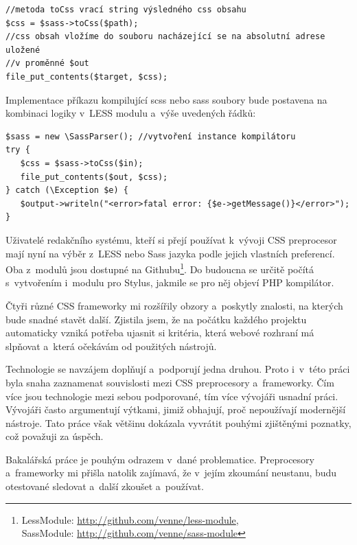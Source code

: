 \documentclass[thesis=B,czech]{FITthesis}[2012/06/26]
\begin{document}
\scriptsize
\begin{verbatim}
//metoda toCss vrací string výsledného css obsahu
$css = $sass->toCss($path); 
//css obsah vložíme do souboru nacházející se na absolutní adrese uložené 
//v proměnné $out
file_put_contents($target, $css);  
\end{verbatim}
\normalsize
Implementace příkazu kompilující scss nebo sass soubory bude postavena na kombinaci logiky v~LESS modulu a~výše uvedených řádků:
\scriptsize
\begin{verbatim}
$sass = new \SassParser(); //vytvoření instance kompilátoru
try {
   $css = $sass->toCss($in); 	
   file_put_contents($out, $css);
} catch (\Exception $e) {
   $output->writeln("<error>fatal error: {$e->getMessage()}</error>");
}
\end{verbatim}
\normalsize
Uživatelé redakčního systému, kteří si přejí používat k~vývoji \gls{CSS} preprocesor mají nyní na výběr z~LESS nebo \gls{Sass} jazyka podle jejich vlastních preferencí. Oba z~modulů jsou dostupné na Githubu\footnote{LessModule: \url{http://github.com/venne/less-module}, \\SassModule: \url{http://github.com/venne/sass-module}}. Do budoucna se určitě počítá s~vytvořením i~modulu pro Stylus, jakmile se pro něj objeví \gls{PHP} kompilátor.


\begin{conclusion}
	Čtyři různé CSS frameworky mi rozšířily obzory a~poskytly znalosti, na kterých bude snadné stavět další. Zjistila jsem, že na počátku každého projektu automaticky vzniká potřeba ujasnit si kritéria, která webové rozhraní má slpňovat a~která očekávám od použitých nástrojů. 

Technologie se navzájem doplňují a~podporují jedna druhou. Proto i~v~této práci byla snaha zaznamenat souvislosti mezi CSS preprocesory a~frameworky. Čím více jsou technologie mezi sebou podporované, tím více vývojáři usnadní práci. Vývojáři často argumentují výtkami, jimiž obhajují, proč nepoužívají modernější nástroje. Tato práce však většinu dokázala vyvrátit pouhými zjištěnými poznatky, což považuji za úspěch. 

Bakalářská práce je pouhým odrazem v~dané problematice. Preprocesory a~frameworky mi přišla natolik zajímavá, že v~jejím zkoumání neustanu, budu otestované sledovat a~další zkoušet a~používat.  

\end{conclusion}



\end{document}
